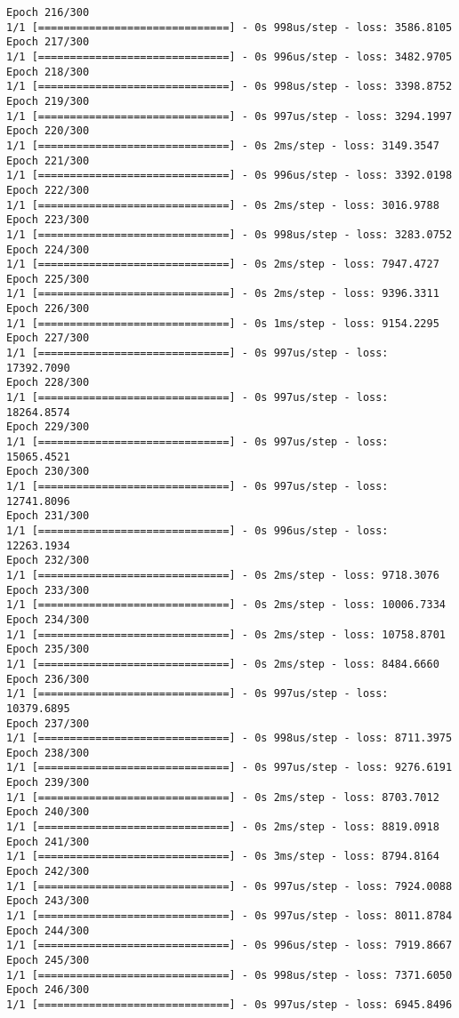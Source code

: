 \documentclass[11pt]{article}
\begin{document}
\begin{Verbatim}[commandchars=\\\{\}]
Epoch 216/300
1/1 [==============================] - 0s 998us/step - loss: 3586.8105
Epoch 217/300
1/1 [==============================] - 0s 996us/step - loss: 3482.9705
Epoch 218/300
1/1 [==============================] - 0s 998us/step - loss: 3398.8752
Epoch 219/300
1/1 [==============================] - 0s 997us/step - loss: 3294.1997
Epoch 220/300
1/1 [==============================] - 0s 2ms/step - loss: 3149.3547
Epoch 221/300
1/1 [==============================] - 0s 996us/step - loss: 3392.0198
Epoch 222/300
1/1 [==============================] - 0s 2ms/step - loss: 3016.9788
Epoch 223/300
1/1 [==============================] - 0s 998us/step - loss: 3283.0752
Epoch 224/300
1/1 [==============================] - 0s 2ms/step - loss: 7947.4727
Epoch 225/300
1/1 [==============================] - 0s 2ms/step - loss: 9396.3311
Epoch 226/300
1/1 [==============================] - 0s 1ms/step - loss: 9154.2295
Epoch 227/300
1/1 [==============================] - 0s 997us/step - loss: 17392.7090
Epoch 228/300
1/1 [==============================] - 0s 997us/step - loss: 18264.8574
Epoch 229/300
1/1 [==============================] - 0s 997us/step - loss: 15065.4521
Epoch 230/300
1/1 [==============================] - 0s 997us/step - loss: 12741.8096
Epoch 231/300
1/1 [==============================] - 0s 996us/step - loss: 12263.1934
Epoch 232/300
1/1 [==============================] - 0s 2ms/step - loss: 9718.3076
Epoch 233/300
1/1 [==============================] - 0s 2ms/step - loss: 10006.7334
Epoch 234/300
1/1 [==============================] - 0s 2ms/step - loss: 10758.8701
Epoch 235/300
1/1 [==============================] - 0s 2ms/step - loss: 8484.6660
Epoch 236/300
1/1 [==============================] - 0s 997us/step - loss: 10379.6895
Epoch 237/300
1/1 [==============================] - 0s 998us/step - loss: 8711.3975
Epoch 238/300
1/1 [==============================] - 0s 997us/step - loss: 9276.6191
Epoch 239/300
1/1 [==============================] - 0s 2ms/step - loss: 8703.7012
Epoch 240/300
1/1 [==============================] - 0s 2ms/step - loss: 8819.0918
Epoch 241/300
1/1 [==============================] - 0s 3ms/step - loss: 8794.8164
Epoch 242/300
1/1 [==============================] - 0s 997us/step - loss: 7924.0088
Epoch 243/300
1/1 [==============================] - 0s 997us/step - loss: 8011.8784
Epoch 244/300
1/1 [==============================] - 0s 996us/step - loss: 7919.8667
Epoch 245/300
1/1 [==============================] - 0s 998us/step - loss: 7371.6050
Epoch 246/300
1/1 [==============================] - 0s 997us/step - loss: 6945.8496

\end{Verbatim}
\end{document}
